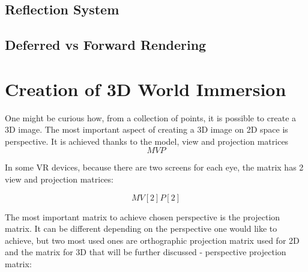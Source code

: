 \subsection{Reflection System}
\label{sec:refl}
\hspace{\parindent}

\subsection{Deferred vs Forward Rendering}
\label{sec:defer_vs_forward}
\hspace{\parindent}


\newpage
\section{Creation of 3D World Immersion}
\hspace{\parindent}
One might be curious how, from a collection of points, it is possible to create a 3D image. The most important aspect of creating a 3D image on 2D space is perspective. It is achieved thanks to the model, view and projection matrices
\begin{equation}
MVP
\label{mvpequation}
\end{equation}

In some VR devices, because there are two screens for each eye, the matrix has 2 view and projection matrices: 

\begin{equation}
MV[2]P[2]
\label{mvp2equation}
\end{equation}

The most important matrix to achieve chosen perspective is the projection matrix. It can be different depending on the perspective one would like to achieve, but two most used ones are orthographic projection matrix used for 2D and the matrix for 3D that will be further discussed - perspective projection matrix:

